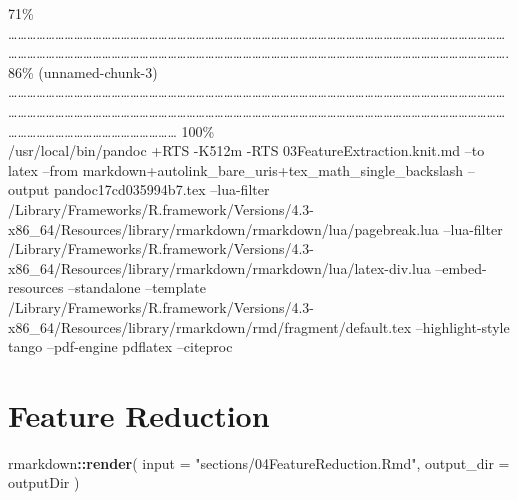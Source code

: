 \documentclass[
]{article}
\newenvironment{Shaded}{\begin{snugshade}}{\end{snugshade}}
\newcommand{\AttributeTok}[1]{\textcolor[rgb]{0.13,0.29,0.53}{#1}}
\newcommand{\FunctionTok}[1]{\textcolor[rgb]{0.13,0.29,0.53}{\textbf{#1}}}
\newcommand{\NormalTok}[1]{#1}
\newcommand{\SpecialCharTok}[1]{\textcolor[rgb]{0.81,0.36,0.00}{\textbf{#1}}}
\newcommand{\StringTok}[1]{\textcolor[rgb]{0.31,0.60,0.02}{#1}}
\begin{document}
\textbar{} 71\% \textbar{}
\textbar\ldots\ldots\ldots\ldots\ldots\ldots\ldots\ldots\ldots\ldots\ldots\ldots\ldots\ldots\ldots\ldots\ldots\ldots\ldots\ldots\ldots\ldots\ldots\ldots\ldots\ldots\ldots\ldots\ldots\ldots\ldots\ldots\ldots\ldots\ldots\ldots\ldots\ldots\ldots\ldots\ldots\ldots\ldots\ldots\ldots\ldots\ldots\ldots\ldots\ldots\ldots\ldots\ldots\ldots\ldots\ldots\ldots\ldots\ldots\ldots\ldots\ldots\ldots\ldots\ldots\ldots\ldots\ldots\ldots\ldots\ldots\ldots\ldots\ldots\ldots\ldots\ldots\ldots\ldots\ldots\ldots\ldots\ldots\ldots\ldots\ldots\ldots\ldots\ldots\ldots\ldots\ldots\ldots\ldots\ldots\ldots\ldots\ldots\ldots\ldots\ldots\ldots\ldots\ldots\ldots\ldots.
\textbar{} 86\% (unnamed-chunk-3) \textbar{}
\textbar\ldots\ldots\ldots\ldots\ldots\ldots\ldots\ldots\ldots\ldots\ldots\ldots\ldots\ldots\ldots\ldots\ldots\ldots\ldots\ldots\ldots\ldots\ldots\ldots\ldots\ldots\ldots\ldots\ldots\ldots\ldots\ldots\ldots\ldots\ldots\ldots\ldots\ldots\ldots\ldots\ldots\ldots\ldots\ldots\ldots\ldots\ldots\ldots\ldots\ldots\ldots\ldots\ldots\ldots\ldots\ldots\ldots\ldots\ldots\ldots\ldots\ldots\ldots\ldots\ldots\ldots\ldots\ldots\ldots\ldots\ldots\ldots\ldots\ldots\ldots\ldots\ldots\ldots\ldots\ldots\ldots\ldots\ldots\ldots\ldots\ldots\ldots\ldots\ldots\ldots\ldots\ldots\ldots\ldots\ldots\ldots\ldots\ldots\ldots\ldots\ldots\ldots\ldots\ldots\ldots\ldots\ldots\ldots\ldots\ldots\ldots\ldots\ldots\ldots\ldots\ldots\ldots\ldots\ldots\ldots\ldots\ldots\ldots\ldots\textbar{}
100\%\\
/usr/local/bin/pandoc +RTS -K512m -RTS 03FeatureExtraction.knit.md --to
latex --from markdown+autolink\_bare\_uris+tex\_math\_single\_backslash
--output pandoc17cd035994b7.tex --lua-filter
/Library/Frameworks/R.framework/Versions/4.3-x86\_64/Resources/library/rmarkdown/rmarkdown/lua/pagebreak.lua
--lua-filter
/Library/Frameworks/R.framework/Versions/4.3-x86\_64/Resources/library/rmarkdown/rmarkdown/lua/latex-div.lua
--embed-resources --standalone --template
/Library/Frameworks/R.framework/Versions/4.3-x86\_64/Resources/library/rmarkdown/rmd/fragment/default.tex
--highlight-style tango --pdf-engine pdflatex --citeproc

\hypertarget{feature-reduction}{%
\section{Feature Reduction}\label{feature-reduction}}

\begin{Shaded}
\begin{Highlighting}[]
\NormalTok{rmarkdown}\SpecialCharTok{::}\FunctionTok{render}\NormalTok{(}
  \AttributeTok{input =} \StringTok{"sections/04FeatureReduction.Rmd"}\NormalTok{,}
  \AttributeTok{output\_dir =}\NormalTok{ outputDir}
\NormalTok{)}
\end{Highlighting}
\end{Shaded}
\end{document}
